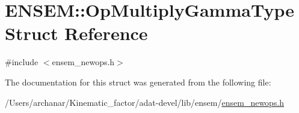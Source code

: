 \hypertarget{structENSEM_1_1OpMultiplyGammaType}{}\section{E\+N\+S\+EM\+:\+:Op\+Multiply\+Gamma\+Type Struct Reference}
\label{structENSEM_1_1OpMultiplyGammaType}


{\ttfamily \#include $<$ensem\+\_\+newops.\+h$>$}



The documentation for this struct was generated from the following file\+:\begin{DoxyCompactItemize}
\item 
/\+Users/archanar/\+Kinematic\+\_\+factor/adat-\/devel/lib/ensem/\mbox{\hyperlink{adat-devel_2lib_2ensem_2ensem__newops_8h}{ensem\+\_\+newops.\+h}}\end{DoxyCompactItemize}
